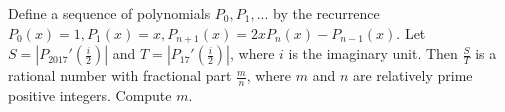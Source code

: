 Define a sequence of polynomials $P_0,P_1,...$ by the recurrence $P_0(x)=1, P_1(x)=x, P_{n+1}(x) = 2xP_n(x)-P_{n-1}(x)$. Let $S=\left|P_{2017}'\left(\frac{i}{2}\right)\right|$ and $T=\left|P_{17}'\left(\frac{i}{2}\right)\right|$, where $i$ is the imaginary unit. Then $\frac{S}{T}$ is a rational number with fractional part $\frac{m}{n}$, where $m$ and $n$ are relatively prime positive integers. Compute $m$.